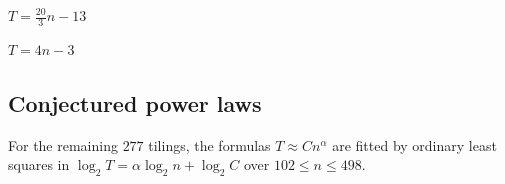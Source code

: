 \begin{minipage}[t]{.19\linewidth}\centering\vspace{0pt}
\par\smallskip
{\small\(T=\frac{20}{3}n-13\)\par}
\end{minipage}
\hfill
\begin{minipage}[t]{.19\linewidth}\centering\vspace{0pt}
\par\smallskip
{\small\(T=4n-3\)\par}
\end{minipage}
\par\vspace{.6em}

\subsection{Conjectured power laws}
For the remaining $277$ tilings, the formulas $T\approx Cn^\alpha$
are fitted by ordinary least squares in $\log_2 T=\alpha\log_2 n+\log_2 C$
over $102\leq n\leq498$.

